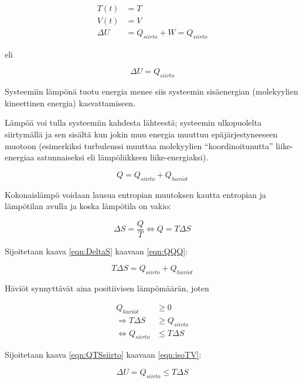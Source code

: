 \documentclass[12pt,a4paper,finnish]{book}
\begin{document}
\begin{align}
 T(t) & = T\\
 V(t) & = V\\
 \Delta U & = Q_{siirto} + W = Q_{siirto}
\end{align}

eli 

\begin{equation}
\label{eqn:isoTV}
 \Delta U = Q_{siirto}
\end{equation}

Systeemiin lämpönä tuotu energia menee siis systeemin sisäenergian (molekyylien kineettinen energia) kasvattamiseen.

Lämpöä voi tulla systeemiin kahdesta lähteestä; systeemin ulkopuolelta siirtymällä ja sen sisältä kun jokin muu 
energia muuttuu epäjärjestyneeseen muotoon (esimerkiksi turbulenssi muuttaa molekyylien ``koordinoitunutta'' 
liike-energiaa satunnaiseksi eli lämpöliikkeen liike-energiaksi).

\begin{equation}
\label{eqn:QQQ}
 Q = Q_{siirto} + Q_{h\ddot{a}vi\ddot{o}t}
\end{equation}

Kokonaislämpö voidaan lausua entropian muutoksen kautta entropian ja lämpötilan avulla ja
koska lämpötila on vakio:

\begin{equation}
\label{eqn:DeltaS}
 \Delta S = \frac{Q}{T} \Leftrightarrow Q = T\Delta S
\end{equation}

Sijoitetaan kaava \ref{eqn:DeltaS} kaavaan \ref{eqn:QQQ}:

\begin{equation}
 T\Delta S = Q_{siirto} + Q_{h\ddot{a}vi\ddot{o}t}
\end{equation}

Häviöt synnyttävät aina positiivisen lämpömäärän, joten

\begin{align}
 Q_{h\ddot{a}vi\ddot{o}t} & \geq 0\\
 \Rightarrow T\Delta S & \geq Q_{siirto}\\
 \label{eqn:QTSsiirto}
 \Leftrightarrow Q_{siirto} & \leq T \Delta S
\end{align}

Sijoitetaan kaava \ref{eqn:QTSsiirto} kaavaan \ref{eqn:isoTV}:

\begin{equation}
 \Delta U = Q_{siirto} \leq T\Delta S
\end{equation}
\end{document}
